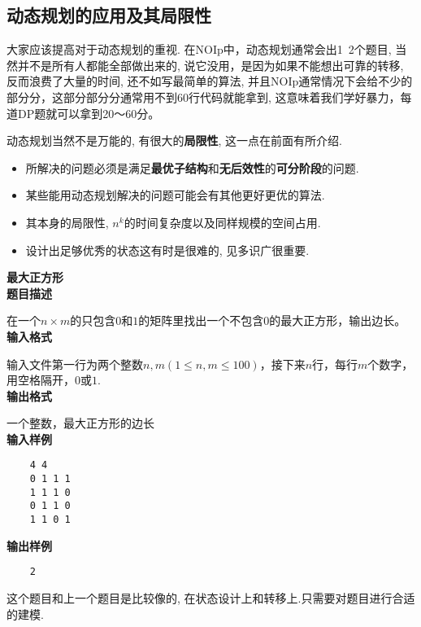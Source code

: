 \subsection{动态规划的应用及其局限性}
大家应该提高对于动态规划的重视.
在NOIp中，动态规划通常会出1~2个题目, 当然并不是所有人都能全部做出来的, 说它没用，是因为如果不能想出可靠的转移, 反而浪费了大量的时间, 还不如写最简单的算法, 并且NOIp通常情况下会给不少的部分分，这部分部分分通常用不到60行代码就能拿到, 这意味着我们学好暴力，每道DP题就可以拿到20～60分。

动态规划当然不是万能的, 有很大的\textbf{局限性}, 这一点在前面有所介绍.
\begin{itemize}
	\item{所解决的问题必须是满足\textbf{最优子结构}和\textbf{无后效性}的\textbf{可分阶段}的问题.}
	\item{某些能用动态规划解决的问题可能会有其他更好更优的算法.}
	\item{其本身的局限性, $n^k$的时间复杂度以及同样规模的空间占用.}
	\item{设计出足够优秀的状态这有时是很难的, 见多识广很重要.}
\end{itemize}
\newpage
\begin{example}\textbf{最大正方形}\\
	\textbf{题目描述}
	
	在一个$n\times m$的只包含$0$和$1$的矩阵里找出一个不包含$0$的最大正方形，输出边长。\\
	\textbf{输入格式}
	
	输入文件第一行为两个整数$n,m(1\leq n,m\leq 100)$，接下来$n$行，每行$m$个数字，用空格隔开，$0$或$1$.\\
	\textbf{输出格式}
	
	一个整数，最大正方形的边长\\
	\textbf{输入样例}
	
	\begin{verbatim}
	4 4
	0 1 1 1
	1 1 1 0
	0 1 1 0
	1 1 0 1
	\end{verbatim}
	\textbf{输出样例}
	\begin{verbatim}
	2
	\end{verbatim}
	
\end{example}

这个题目和上一个题目是比较像的, 在状态设计上和转移上.只需要对题目进行合适的建模.

